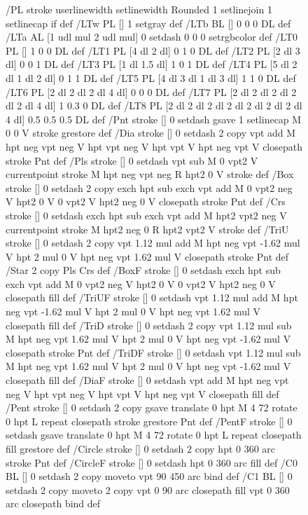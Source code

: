 \documentclass{LMCS}
\begin{document}
\begin{figure}[!tbp]
{{{/PL { stroke userlinewidth setlinewidth
      Rounded { 1 setlinejoin 1 setlinecap } if } def
/LTw { PL [] 1 setgray } def
/LTb { BL [] 0 0 0 DL } def
/LTa { AL [1 udl mul 2 udl mul] 0 setdash 0 0 0 setrgbcolor } def
/LT0 { PL [] 1 0 0 DL } def
/LT1 { PL [4 dl 2 dl] 0 1 0 DL } def
/LT2 { PL [2 dl 3 dl] 0 0 1 DL } def
/LT3 { PL [1 dl 1.5 dl] 1 0 1 DL } def
/LT4 { PL [5 dl 2 dl 1 dl 2 dl] 0 1 1 DL } def
/LT5 { PL [4 dl 3 dl 1 dl 3 dl] 1 1 0 DL } def
/LT6 { PL [2 dl 2 dl 2 dl 4 dl] 0 0 0 DL } def
/LT7 { PL [2 dl 2 dl 2 dl 2 dl 2 dl 4 dl] 1 0.3 0 DL } def
/LT8 { PL [2 dl 2 dl 2 dl 2 dl 2 dl 2 dl 2 dl 4 dl] 0.5 0.5 0.5 DL } def
/Pnt { stroke [] 0 setdash
   gsave 1 setlinecap M 0 0 V stroke grestore } def
/Dia { stroke [] 0 setdash 2 copy vpt add M
  hpt neg vpt neg V hpt vpt neg V
  hpt vpt V hpt neg vpt V closepath stroke
  Pnt } def
/Pls { stroke [] 0 setdash vpt sub M 0 vpt2 V
  currentpoint stroke M
  hpt neg vpt neg R hpt2 0 V stroke
  } def
/Box { stroke [] 0 setdash 2 copy exch hpt sub exch vpt add M
  0 vpt2 neg V hpt2 0 V 0 vpt2 V
  hpt2 neg 0 V closepath stroke
  Pnt } def
/Crs { stroke [] 0 setdash exch hpt sub exch vpt add M
  hpt2 vpt2 neg V currentpoint stroke M
  hpt2 neg 0 R hpt2 vpt2 V stroke } def
/TriU { stroke [] 0 setdash 2 copy vpt 1.12 mul add M
  hpt neg vpt -1.62 mul V
  hpt 2 mul 0 V
  hpt neg vpt 1.62 mul V closepath stroke
  Pnt  } def
/Star { 2 copy Pls Crs } def
/BoxF { stroke [] 0 setdash exch hpt sub exch vpt add M
  0 vpt2 neg V  hpt2 0 V  0 vpt2 V
  hpt2 neg 0 V  closepath fill } def
/TriUF { stroke [] 0 setdash vpt 1.12 mul add M
  hpt neg vpt -1.62 mul V
  hpt 2 mul 0 V
  hpt neg vpt 1.62 mul V closepath fill } def
/TriD { stroke [] 0 setdash 2 copy vpt 1.12 mul sub M
  hpt neg vpt 1.62 mul V
  hpt 2 mul 0 V
  hpt neg vpt -1.62 mul V closepath stroke
  Pnt  } def
/TriDF { stroke [] 0 setdash vpt 1.12 mul sub M
  hpt neg vpt 1.62 mul V
  hpt 2 mul 0 V
  hpt neg vpt -1.62 mul V closepath fill} def
/DiaF { stroke [] 0 setdash vpt add M
  hpt neg vpt neg V hpt vpt neg V
  hpt vpt V hpt neg vpt V closepath fill } def
/Pent { stroke [] 0 setdash 2 copy gsave
  translate 0 hpt M 4 {72 rotate 0 hpt L} repeat
  closepath stroke grestore Pnt } def
/PentF { stroke [] 0 setdash gsave
  translate 0 hpt M 4 {72 rotate 0 hpt L} repeat
  closepath fill grestore } def
/Circle { stroke [] 0 setdash 2 copy
  hpt 0 360 arc stroke Pnt } def
/CircleF { stroke [] 0 setdash hpt 0 360 arc fill } def
/C0 { BL [] 0 setdash 2 copy moveto vpt 90 450  arc } bind def
/C1 { BL [] 0 setdash 2 copy        moveto
       2 copy  vpt 0 90 arc closepath fill
               vpt 0 360 arc closepath } bind def
}}}
\end{figure}
\end{document}
